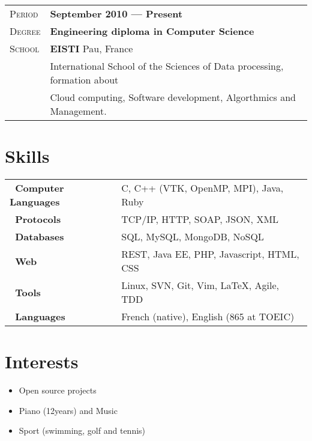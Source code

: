 \documentclass[a4paper, oneside, final]{scrartcl} %
\newcommand{\gray}{\rowcolor[gray]{.90}} %
\begin{document}
\begin{center}
\begin{tabularx}{1\linewidth}{>{\raggedleft\scshape}p{2cm}X}
  \gray Period & \textbf{September 2010 --- Present}\\
  \gray Degree & \textbf{Engineering diploma in Computer Science}\\
  \gray School & \textbf{EISTI} \hfill Pau, France\\
  & International School of the Sciences of Data processing, formation about\\
  & Cloud computing, Software development, Algorthmics and Management.
\end{tabularx}


\section{Skills}

\begin{tabular}{ @{} >{\bfseries}l @{\hspace{4ex}} l }
  ~Computer Languages & C, C++ (VTK, OpenMP, MPI), Java, Ruby \\
  ~Protocols          & TCP/IP, HTTP, SOAP, JSON, XML\\
  ~Databases          & SQL, MySQL, MongoDB, NoSQL \\
  ~Web                & REST, Java EE, PHP, Javascript, HTML, CSS \\
  ~Tools              & Linux, SVN, Git, Vim,  \LaTeX, Agile, TDD\\
  ~Languages          & French (native), English (865 at TOEIC)
\end{tabular}




\section{Interests}

\begin{itemize}[noitemsep,topsep=0pt,parsep=0pt,partopsep=0pt]
 \setlength{\itemsep}{1pt}
 \item Open source projects
 \item Piano (12years) and Music
 \item Sport (swimming, golf and tennis)
\end{itemize}


\end{center}
\end{document}
